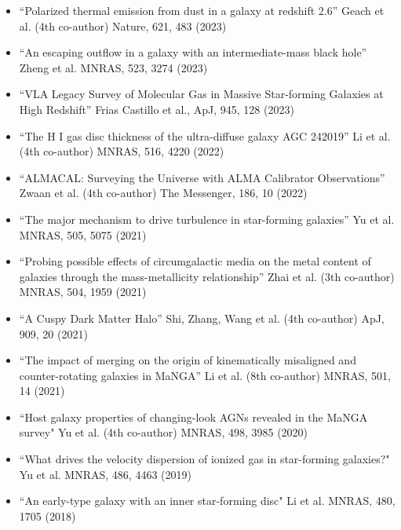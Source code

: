 \documentclass[A4,11pt]{article}
\newenvironment{paperlist}
{ \begin{itemize}[leftmargin=0.8cm, label={$\bullet$}]
    \setlength{\itemsep}{1pt}
    \setlength{\parskip}{1pt}
    \setlength{\parsep}{1pt}     }
{ \end{itemize}                  }
\begin{document}
\begin{paperlist}
    \item ``Polarized thermal emission from dust in a galaxy at redshift 2.6'' Geach et al. (4th co-author) Nature, 621, 483 (2023)
    \item ``An escaping outflow in a galaxy with an intermediate-mass black hole'' Zheng et al. MNRAS, 523, 3274 (2023)
    \item ``VLA Legacy Survey of Molecular Gas in Massive Star-forming Galaxies at High Redshift'' Frias Castillo et al., ApJ, 945, 128 (2023)
    \item ``The H I gas disc thickness of the ultra-diffuse galaxy AGC 242019'' Li et al. (4th co-author) MNRAS, 516, 4220 (2022)
    \item ``ALMACAL: Surveying the Universe with ALMA Calibrator Observations'' Zwaan et al. (4th co-author) The Messenger, 186, 10 (2022)
    \item ``The major mechanism to drive turbulence in star-forming galaxies'' Yu et al. MNRAS, 505, 5075 (2021)
    \item ``Probing possible effects of circumgalactic media on the metal content of galaxies through the mass-metallicity relationship'' Zhai et al. (3th co-author) MNRAS, 504, 1959 (2021)
    \item ``A Cuspy Dark Matter Halo” Shi, Zhang, Wang et al. (4th co-author) ApJ, 909, 20 (2021)
    \item ``The impact of merging on the origin of kinematically misaligned and counter-rotating galaxies in MaNGA'' Li et al. (8th co-author) MNRAS, 501, 14 (2021)
    \item ``Host galaxy properties of changing-look AGNs revealed in the MaNGA survey" Yu et al. (4th co-author) MNRAS, 498, 3985 (2020)
    \item ``What drives the velocity dispersion of ionized gas in star-forming galaxies?" Yu et al. MNRAS, 486, 4463 (2019)
    \item ``An early-type galaxy with an inner star-forming disc" Li et al. MNRAS, 480, 1705 (2018)
\end{paperlist}
\end{document}
